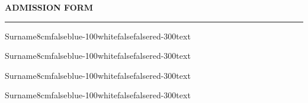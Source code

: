 \documentclass[11pt]{article}
\begin{document}
\begin{center}
    \Large \textbf{ADMISSION FORM}\vspace{2mm}
    \hrule
\end{center}\vspace{10mm}


\begin{formpackfieldTOP}
    {Surname}{8cm}{false}{blue-100}{white}{false}{false}{red-300}{text}
\end{formpackfieldTOP}

\vspace{10mm}

\begin{formpackfieldTOPNOLINE}
    {Surname}{8cm}{false}{blue-100}{white}{false}{false}{red-300}{text}
\end{formpackfieldTOPNOLINE}

\vspace{10mm}

\begin{formpackfieldBOTTOM}
    {Surname}{8cm}{false}{blue-100}{white}{false}{false}{red-300}{text}
\end{formpackfieldBOTTOM}

\vspace{10mm}

\begin{formpackfieldBOTTOMNOLINE}
    {Surname}{8cm}{false}{blue-100}{white}{false}{false}{red-300}{text}
\end{formpackfieldBOTTOMNOLINE}
\end{document}

